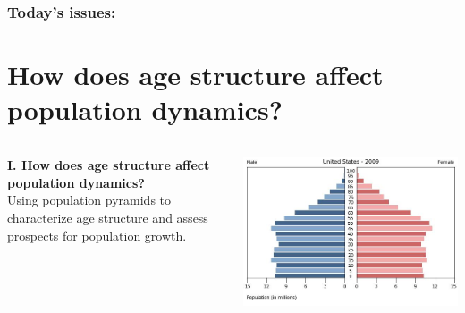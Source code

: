 \begin{noheadline}
\begin{frame}
\frametitle{Today's issues:}
\vspace{5mm}
\tableofcontents
\end{frame}
\end{noheadline}

\section{How does age structure affect population dynamics?}

\begin{frame}[t]
    \begin{adjustwidth}{-2em}{-1.5em}

    \vspace{-3mm}

    \begin{columns}[t]
    

    \textbf{I. How does age structure affect population dynamics?} \\

    \vspace{0.3cm}
    Using population pyramids to characterize age structure and assess
    prospects for population growth.\\



    \includegraphics[width=1\columnwidth]{../images/pop-pyramid-usa-2009.png}


\end{columns}
\end{adjustwidth}
\end{frame}
